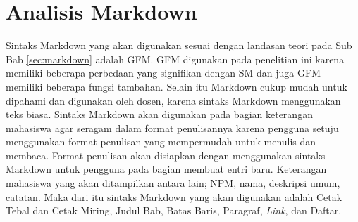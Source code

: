 \section{Analisis Markdown}
\label{sec:analisisMarkdown}
Sintaks Markdown yang akan digunakan sesuai dengan landasan teori pada Sub Bab \ref{sec:markdown} adalah GFM. GFM digunakan pada penelitian ini karena memiliki beberapa perbedaan yang signifikan dengan SM dan juga GFM memiliki beberapa fungsi tambahan. Selain itu Markdown cukup mudah untuk dipahami dan digunakan oleh dosen, karena sintaks Markdown menggunakan teks biasa. Sintaks Markdown akan digunakan pada bagian keterangan mahasiswa agar seragam dalam format penulisannya karena pengguna setuju menggunakan format penulisan yang mempermudah untuk menulis dan membaca. Format penulisan akan disiapkan dengan menggunakan sintaks Markdown untuk pengguna pada bagian membuat entri baru. Keterangan mahasiswa yang akan ditampilkan antara lain; NPM, nama, deskripsi umum, catatan. Maka dari itu sintaks Markdown yang akan digunakan adalah Cetak Tebal dan Cetak Miring, Judul Bab, Batas Baris, Paragraf, {\it Link}, dan Daftar.


